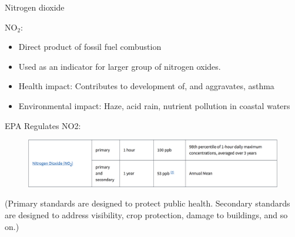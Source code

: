 \documentclass[aspectratio=169]{beamer}
\begin{document}
\begin{frame}{Nitrogen dioxide}

NO$_2$:
\begin{itemize}
\item Direct product of fossil fuel combustion
\item Used as an indicator for larger group of nitrogen oxides.
\item Health impact: Contributes to development of, and aggravates, asthma 
\item Environmental impact: Haze, acid rain, nutrient pollution in coastal waters
\end{itemize}

EPA Regulates NO2:
\begin{figure}
\includegraphics[width=\textwidth]{EPA_NO2_reg}
\end{figure}

\vspace{-4mm}

{\footnotesize (Primary standards are designed to protect public health.  Secondary standards are designed to address visibility, crop protection, damage to buildings, and so on.)}
\end{frame}
\end{document}
